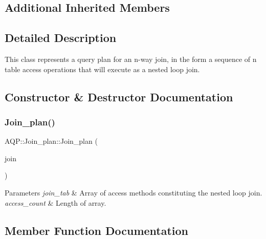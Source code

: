 \subsection*{Additional Inherited Members}


\subsection{Detailed Description}
This class represents a query plan for an n-\/way join, in the form a sequence of n table access operations that will execute as a nested loop join. 

\subsection{Constructor \& Destructor Documentation}
\mbox{\label{classAQP_1_1Join__plan_a93bbcdd095b3cc551f4cd5d767c21462}} 
\subsubsection{\texorpdfstring{Join\+\_\+plan()}{Join\_plan()}}
{\footnotesize\ttfamily A\+Q\+P\+::\+Join\+\_\+plan\+::\+Join\+\_\+plan (\begin{DoxyParamCaption}\item[{const \mbox{\hyperlink{classJOIN}{J\+O\+IN}} $\ast$}]{join }\end{DoxyParamCaption})\hspace{0.3cm}{\ttfamily [explicit]}}


\begin{DoxyParams}{Parameters}
{\em join\+\_\+tab} & Array of access methods constituting the nested loop join. \\
\hline
{\em access\+\_\+count} & Length of array. \\
\hline
\end{DoxyParams}


\subsection{Member Function Documentation}
\mbox{\label{classAQP_1_1Join__plan_a92950b7a49e0702cf5490b0f0797a076}} 
